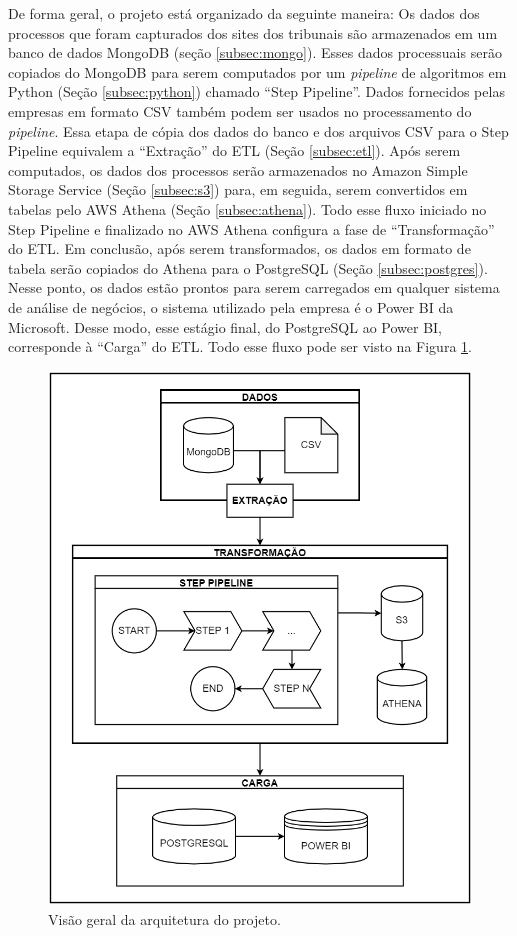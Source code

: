 De forma geral, o projeto está organizado da seguinte maneira: Os dados dos processos que foram capturados dos sites dos tribunais são armazenados em um banco de dados MongoDB (seção \ref{subsec:mongo}). Esses dados processuais serão copiados do MongoDB para serem computados por um \textit{pipeline} de algoritmos em Python (Seção \ref{subsec:python}) chamado \enquote{Step Pipeline}. Dados fornecidos pelas empresas em formato CSV também podem ser usados no processamento do \textit{pipeline}. Essa etapa de cópia dos dados do banco e dos arquivos CSV para o Step Pipeline equivalem a \enquote{Extração} do ETL (Seção \ref{subsec:etl}). Após serem computados, os dados dos processos serão armazenados no Amazon Simple Storage Service (Seção \ref{subsec:s3}) para, em seguida, serem convertidos em tabelas pelo AWS Athena (Seção \ref{subsec:athena}). Todo esse fluxo iniciado no Step Pipeline e finalizado no AWS Athena configura a fase de \enquote{Transformação} do ETL. Em conclusão, após serem transformados, os dados em formato de tabela serão copiados do Athena para o PostgreSQL (Seção \ref{subsec:postgres}). Nesse ponto, os dados estão prontos para serem carregados em qualquer sistema de análise de negócios, o sistema utilizado pela empresa é o Power BI da Microsoft. Desse modo, esse estágio final, do PostgreSQL ao Power BI, corresponde à \enquote{Carga} do ETL. Todo esse fluxo pode ser visto na Figura \ref{fig:arquiteturaGeral}.

\begin{figure}[ht]
\centering
\includegraphics[width=.6\textwidth]{imagens/arquitetura_geral.png}
\caption{Visão geral da arquitetura do projeto.}
\label{fig:arquiteturaGeral}
\end{figure}

